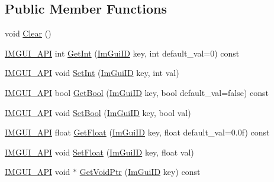 \subsection*{Public Member Functions}
\begin{DoxyCompactItemize}
\item 
void \mbox{\hyperlink{struct_im_gui_storage_a72ceecfbca3d08df8c2a232b77890c20}{Clear}} ()
\item 
\mbox{\hyperlink{imgui_8h_a43829975e84e45d1149597467a14bbf5}{I\+M\+G\+U\+I\+\_\+\+A\+PI}} int \mbox{\hyperlink{struct_im_gui_storage_ac86b64f5c69a15de6c6c326963eca64a}{Get\+Int}} (\mbox{\hyperlink{imgui_8h_a1785c9b6f4e16406764a85f32582236f}{Im\+Gui\+ID}} key, int default\+\_\+val=0) const
\item 
\mbox{\hyperlink{imgui_8h_a43829975e84e45d1149597467a14bbf5}{I\+M\+G\+U\+I\+\_\+\+A\+PI}} void \mbox{\hyperlink{struct_im_gui_storage_af83975ca841a9bd0e06a6ea0a41bf159}{Set\+Int}} (\mbox{\hyperlink{imgui_8h_a1785c9b6f4e16406764a85f32582236f}{Im\+Gui\+ID}} key, int val)
\item 
\mbox{\hyperlink{imgui_8h_a43829975e84e45d1149597467a14bbf5}{I\+M\+G\+U\+I\+\_\+\+A\+PI}} bool \mbox{\hyperlink{struct_im_gui_storage_a22d34ae6278f86468a3e7df8fbd1b632}{Get\+Bool}} (\mbox{\hyperlink{imgui_8h_a1785c9b6f4e16406764a85f32582236f}{Im\+Gui\+ID}} key, bool default\+\_\+val=false) const
\item 
\mbox{\hyperlink{imgui_8h_a43829975e84e45d1149597467a14bbf5}{I\+M\+G\+U\+I\+\_\+\+A\+PI}} void \mbox{\hyperlink{struct_im_gui_storage_ac5beee31a59b3f5294b41992717be7bf}{Set\+Bool}} (\mbox{\hyperlink{imgui_8h_a1785c9b6f4e16406764a85f32582236f}{Im\+Gui\+ID}} key, bool val)
\item 
\mbox{\hyperlink{imgui_8h_a43829975e84e45d1149597467a14bbf5}{I\+M\+G\+U\+I\+\_\+\+A\+PI}} float \mbox{\hyperlink{struct_im_gui_storage_a0f51ef327f7e548d003b0e006967c1eb}{Get\+Float}} (\mbox{\hyperlink{imgui_8h_a1785c9b6f4e16406764a85f32582236f}{Im\+Gui\+ID}} key, float default\+\_\+val=0.\+0f) const
\item 
\mbox{\hyperlink{imgui_8h_a43829975e84e45d1149597467a14bbf5}{I\+M\+G\+U\+I\+\_\+\+A\+PI}} void \mbox{\hyperlink{struct_im_gui_storage_ab531d90a0e5a1a2453e351c499149756}{Set\+Float}} (\mbox{\hyperlink{imgui_8h_a1785c9b6f4e16406764a85f32582236f}{Im\+Gui\+ID}} key, float val)
\item 
\mbox{\hyperlink{imgui_8h_a43829975e84e45d1149597467a14bbf5}{I\+M\+G\+U\+I\+\_\+\+A\+PI}} void $\ast$ \mbox{\hyperlink{struct_im_gui_storage_aaf87a98ede89da09113b0189f6d878ca}{Get\+Void\+Ptr}} (\mbox{\hyperlink{imgui_8h_a1785c9b6f4e16406764a85f32582236f}{Im\+Gui\+ID}} key) const

\end{DoxyCompactItemize}

